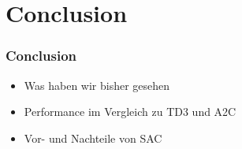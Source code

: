 \section{Conclusion}
\begin{frame}
    \frametitle{Conclusion}
    \begin{itemize}    
        \item Was haben wir bisher gesehen
        \item Performance im Vergleich zu TD3 und A2C
        \item Vor- und Nachteile von SAC
    \end{itemize}

\end{frame}